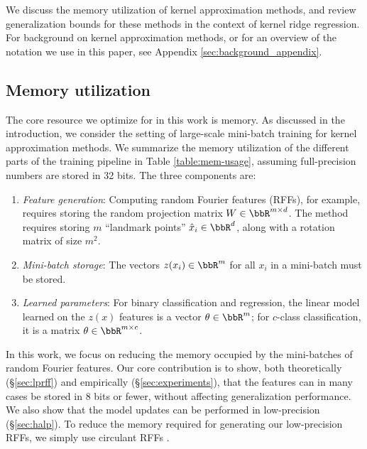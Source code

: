We discuss the memory utilization of kernel approximation methods, and review generalization bounds for these methods in the context of kernel ridge regression. For background on kernel approximation methods, or for an overview of the notation we use in this paper, see Appendix \ref{sec:background_appendix}.

\subsection{Memory utilization}
\label{subsec:memory_utils}
The core resource we optimize for in this work is memory.  As discussed in the introduction, we consider the setting of large-scale mini-batch training for kernel approximation methods. We summarize the memory utilization of the different parts of the training pipeline in Table \ref{table:mem-usage}, assuming full-precision numbers are stored in 32 bits. The three components are:
\begin{enumerate}
	\item \textit{Feature generation}: Computing random Fourier features (RFFs), for example, requires storing the random projection matrix $W \in \RR^{m\times d}$. The \Nystrom method requires storing $m$ ``landmark points'' $\hx_i \in \RR^d$, along with a rotation matrix of size $m^2$.
	\item \textit{Mini-batch storage}: The vectors $z(x_i)\in\RR^m$ for all $x_i$ in a mini-batch must be stored.
	\item \textit{Learned parameters}: For binary classification and regression, the linear model learned on the $z(x)$ features is a vector $\theta \in \RR^m$; for $c$-class classification, it is a matrix $\theta \in \RR^{m\times c}$.	
\end{enumerate}

In this work, we focus on reducing the memory occupied by the mini-batches of random Fourier features. Our core contribution is to show, both theoretically (\S\ref{sec:lprff}) and empirically (\S\ref{sec:experiments}), that the features can in many cases be stored in 8 bits or fewer, without affecting generalization performance. We also show that the model updates can be performed in low-precision  (\S\ref{sec:halp}). To reduce the memory required for generating our low-precision RFFs, we simply use circulant RFFs \cite{yu15}.


